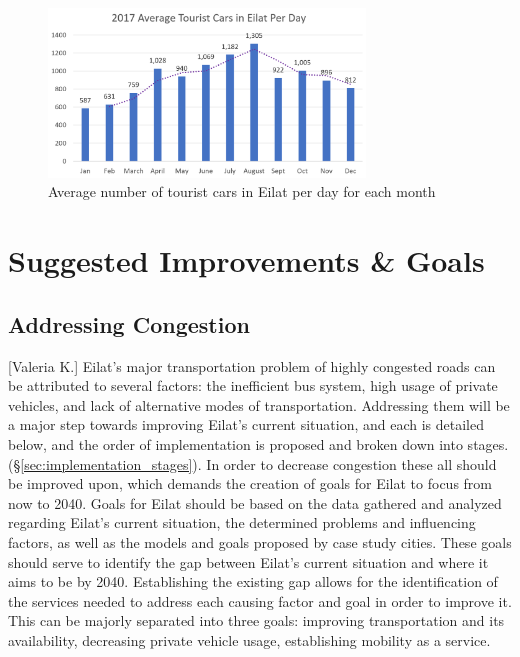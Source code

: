 \documentclass[12pt]{article}                               %
\begin{document}
\begin{figure}[H]
    \centering
    \includegraphics[width=0.75\textwidth]{images/cars_per_day.png}
    \caption{Average number of tourist cars in Eilat per day for each month}
    \label{img:cars_per_day}
\end{figure}

\newpage
\section{Suggested Improvements \& Goals}\label{sec:discussion}
\subsection{Addressing Congestion}[Valeria K.]
Eilat's major transportation problem of highly congested roads can be attributed to several factors: the inefficient bus system, high usage of private vehicles, and lack of alternative modes of transportation. Addressing them will be a major step towards improving Eilat's current situation, and each is detailed below, and the order of implementation is proposed and broken down into stages. (\S\ref{sec:implementation_stages}). In order to decrease congestion these all should be improved upon, which demands the creation of goals for Eilat to focus from now to 2040. Goals for Eilat should be based on the data gathered and analyzed regarding Eilat's current situation, the determined problems and influencing factors, as well as the models and goals proposed by case study cities. These goals should serve to identify the gap between Eilat's current situation and where it aims to be by 2040. Establishing the existing gap allows for the identification of the services needed to address each causing factor and goal in order to improve it. This can be majorly separated into three goals: improving transportation and its availability, decreasing private vehicle usage,  establishing mobility as a service. 
\end{document}
